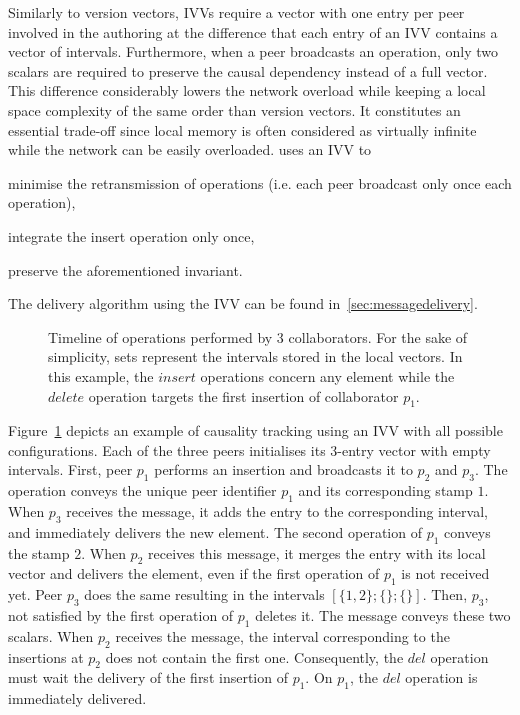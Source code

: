 Similarly to version vectors, IVVs require a vector with one entry per peer
involved in the authoring at the difference that each entry of an IVV contains
a vector of intervals. Furthermore, when a peer broadcasts an operation, only
two scalars are required to preserve the causal dependency instead of a full
vector. This difference considerably lowers the network overload while keeping
a local space complexity of the same order than version vectors.  It
constitutes an essential trade-off since local memory is often considered as
virtually infinite while the network can be easily overloaded. \EDITORNAME{}
uses an IVV to
\begin{inparaenum}[(i)]
\item minimise the retransmission of operations (i.e. each peer broadcast only
  once each operation),
\item integrate the insert operation only once,
\item preserve the aforementioned invariant.
\end{inparaenum}
The delivery algorithm using the IVV can be found in~\ref{sec:messagedelivery}.

\begin{figure}
  \centering 
  \caption{\label{fig:timelineexample}Timeline of operations performed by 3
    collaborators. For the sake of simplicity, sets represent the intervals
    stored in the local vectors. In this example, the $insert$ operations
    concern any element while the $delete$ operation targets the first
    insertion of collaborator $p_1$.}
\end{figure}

Figure~\ref{fig:timelineexample} depicts an example of causality tracking using
an IVV with all possible configurations. Each of the three peers initialises
its 3-entry vector with empty intervals. First, peer $p_1$ performs an
insertion and broadcasts it to $p_2$ and $p_3$. The operation conveys the
unique peer identifier $p_1$ and its corresponding stamp $1$. When $p_3$
receives the message, it adds the entry to the corresponding interval, and
immediately delivers the new element. The second operation of $p_1$ conveys the
stamp $2$. When $p_2$ receives this message, it merges the entry with its local
vector and delivers the element, even if the first operation of $p_1$ is not
received yet. Peer $p_3$ does the same resulting in the intervals
$[\{1,2\};\{\};\{\}]$. Then, $p_3$, not satisfied by the first operation of
$p_1$ deletes it. The message conveys these two scalars. When $p_2$ receives
the message, the interval corresponding to the insertions at $p_2$ does not
contain the first one. Consequently, the $del$ operation must wait the delivery
of the first insertion of $p_1$. On $p_1$, the $del$ operation is immediately
delivered.


